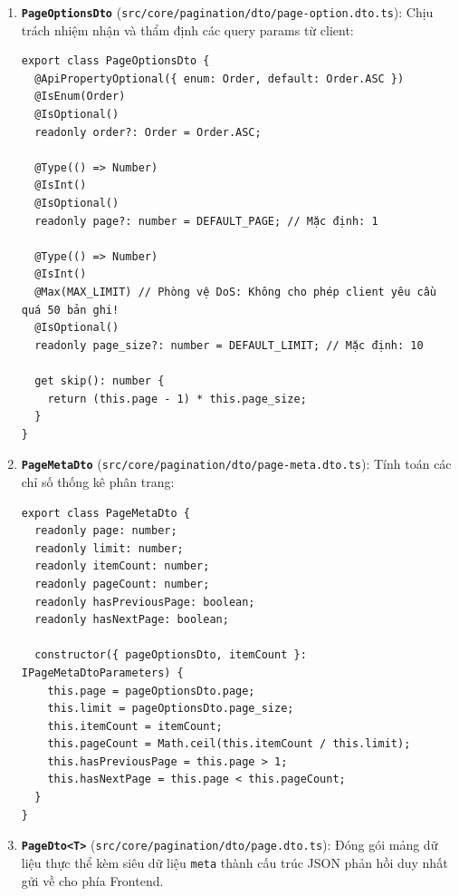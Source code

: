 \documentclass[12pt,a4paper,oneside]{book}
\begin{document}
\begin{enumerate}
  \item \textbf{\texttt{PageOptionsDto}} (\texttt{src/core/pagination/dto/page-option.dto.ts}): Chịu trách nhiệm nhận và thẩm định các query params từ client:
\begin{codebox}
\begin{Verbatim}[fontsize=\small]
export class PageOptionsDto {
  @ApiPropertyOptional({ enum: Order, default: Order.ASC })
  @IsEnum(Order)
  @IsOptional()
  readonly order?: Order = Order.ASC;

  @Type(() => Number)
  @IsInt()
  @IsOptional()
  readonly page?: number = DEFAULT_PAGE; // Mặc định: 1

  @Type(() => Number)
  @IsInt()
  @Max(MAX_LIMIT) // Phòng vệ DoS: Không cho phép client yêu cầu quá 50 bản ghi!
  @IsOptional()
  readonly page_size?: number = DEFAULT_LIMIT; // Mặc định: 10

  get skip(): number {
    return (this.page - 1) * this.page_size;
  }
}
\end{Verbatim}
\end{codebox}

  \item \textbf{\texttt{PageMetaDto}} (\texttt{src/core/pagination/dto/page-meta.dto.ts}): Tính toán các chỉ số thống kê phân trang:
\begin{codebox}
\begin{Verbatim}[fontsize=\small]
export class PageMetaDto {
  readonly page: number;
  readonly limit: number;
  readonly itemCount: number;
  readonly pageCount: number;
  readonly hasPreviousPage: boolean;
  readonly hasNextPage: boolean;

  constructor({ pageOptionsDto, itemCount }: IPageMetaDtoParameters) {
    this.page = pageOptionsDto.page;
    this.limit = pageOptionsDto.page_size;
    this.itemCount = itemCount;
    this.pageCount = Math.ceil(this.itemCount / this.limit);
    this.hasPreviousPage = this.page > 1;
    this.hasNextPage = this.page < this.pageCount;
  }
}
\end{Verbatim}
\end{codebox}

  \item \textbf{\texttt{PageDto<T>}} (\texttt{src/core/pagination/dto/page.dto.ts}): Đóng gói mảng dữ liệu thực thể kèm siêu dữ liệu \texttt{meta} thành cấu trúc JSON phản hồi duy nhất gửi về cho phía Frontend.
\end{enumerate}
\end{document}
